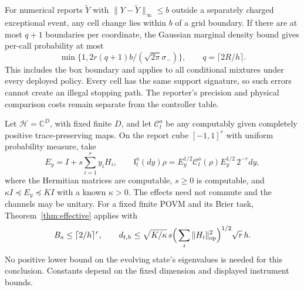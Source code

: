 For numerical reports $\widetilde Y$ with $\|Y-\widetilde Y\|_\infty\le b$ outside a separately charged exceptional event, any cell change lies within $b$ of a grid boundary. If there are at most $q+1$ boundaries per coordinate, the Gaussian marginal density bound gives per-call probability at most
\[
 \min\{1,2r(q+1)b/(\sqrt{2\pi}\sigma_-)\},
 \qquad q=\lceil2R/h\rceil.
\]
This includes the box boundary and applies to all conditional mixtures under every deployed policy. Every cell has the same support signature, so such errors cannot create an illegal stopping path. The reporter's precision and physical comparison costs remain separate from the controller table.

\begin{theorem}\label{thm:effective_quantum}
Let $\mathcal H=\mathbb C^D$, with fixed finite $D$, and let $\mathcal C_t^a$ be any computably given completely positive trace-preserving maps. On the report cube $[-1,1]^r$ with uniform probability measure, take
\[
 E_y=I+s\sum_{i=1}^r y_iH_i,\qquad
 \mathsf I_t^a(dy)\rho=E_y^{1/2}\mathcal C_t^a(\rho)E_y^{1/2}\,2^{-r}dy,
\]
where the Hermitian matrices are computable, $s\ge0$ is computable, and
$\kappa I\preceq E_y\preceq K I$ with a known $\kappa>0$. The effects need not commute and the channels may be unitary. For a fixed finite POVM and its Brier task, Theorem~\ref{thm:effective} applies with
\begin{equation}\label{eq:quantum_effective}
 B_a\le\lceil2/h\rceil^r,\qquad
 d_{t,h}\le \sqrt{K/\kappa}\,s
       \Big(\sum_i\|H_i\|_{\rm op}^2\Big)^{1/2}\sqrt r\,h.
\end{equation}
No positive lower bound on the evolving state's eigenvalues is needed for this conclusion. Constants depend on the fixed dimension and displayed instrument bounds.
\end{theorem}
